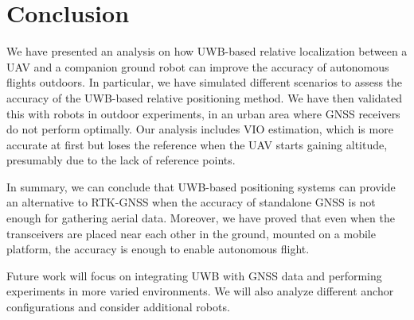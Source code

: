 
\section{Conclusion}\label{sec:conclusion}

We have presented an analysis on how UWB-based relative localization between a UAV and a companion ground robot can improve the accuracy of autonomous flights outdoors. In particular, we have simulated different scenarios to assess the accuracy of the UWB-based relative positioning method. We have then validated this with robots in outdoor experiments, in an urban area where GNSS receivers do not perform optimally. Our analysis includes VIO estimation, which is more accurate at first but loses the reference when the UAV starts gaining altitude, presumably due to the lack of reference points.

In summary, we can conclude that UWB-based positioning systems can provide an alternative to RTK-GNSS when the accuracy of standalone GNSS is not enough for gathering aerial data. Moreover, we have proved that even when the transceivers are placed near each other in the ground, mounted on a mobile platform, the accuracy is enough to enable autonomous flight. 

Future work will focus on integrating UWB with GNSS data and performing experiments in more varied environments. We will also analyze different anchor configurations and consider additional robots.
